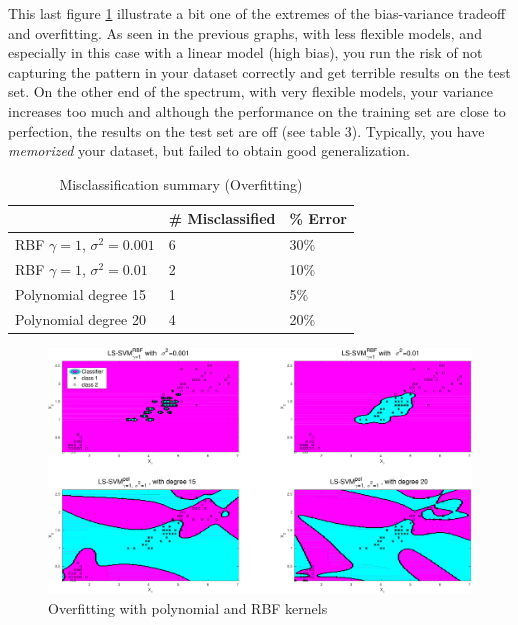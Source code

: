 \documentclass[11pt, a4paper]{article}
\begin{document}
This last figure \ref{fig:iris_overfitting} illustrate a bit one of
the extremes of the bias-variance tradeoff and overfitting. As seen in
the previous graphs, with less flexible models, and especially in this
case with a linear model (high bias), you run the risk of not
capturing the pattern in your dataset correctly and get terrible
results on the test set. On the other end of the spectrum, with very
flexible models, your variance increases too much and although the
performance on the training set are close to perfection, the results
on the test set are off (see table 3). Typically, you have
\emph{memorized} your dataset, but failed to obtain good
generalization.

\begin{table}[H]
  \centering
  \begin{tabular}{l|l|l|}
    \cline{2-3}
    & \# Misclassified & \% Error \\ \hline
    \multicolumn{1}{|l|}{RBF $\gamma=1$, $\sigma^2=0.001$} & 6                 & 30\%     \\ \hline
    \multicolumn{1}{|l|}{RBF $\gamma=1$, $\sigma^2=0.01$}  & 2                 & 10\%      \\ \hline
    \multicolumn{1}{|l|}{Polynomial degree 15}    & 1                 & 5\%      \\ \hline
    \multicolumn{1}{|l|}{Polynomial degree 20}   & 4                 & 20\%      \\ \hline
  \end{tabular}
  \label{table:iris_over}
  \caption{Misclassification summary (Overfitting)}
\end{table}

\begin{figure}[H]
    \centering
    \includegraphics[scale=.40]{iris_overfitting.pdf}
    \caption{Overfitting with polynomial and RBF kernels}
    \label{fig:iris_overfitting}
\end{figure}
\end{document}
